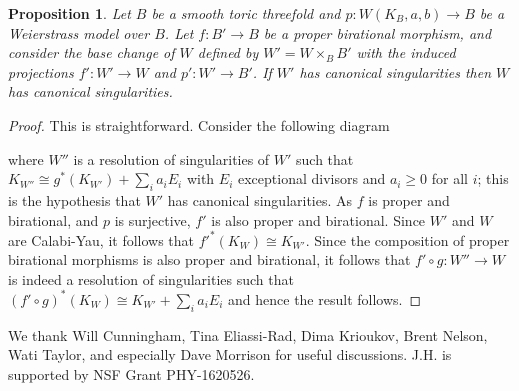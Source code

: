 \documentclass[aps,prl,twocolumn, superscriptaddress,groupedaddress,nofootinbib]{revtex4-1}
\newtheorem{prop}{Proposition}
\newcommand{\XXX}[3]{}
\begin{document}
\begin{prop}
\label{prop:pullback}
Let $B$ be a smooth toric threefold and $p \colon W(K_{B},a,b) \rightarrow B$ be a Weierstrass model over $B$. Let $f \colon B' \rightarrow B$ be a proper birational morphism, and consider the base change of $W$ defined by $W' = W\times_{B}B'$ with the induced projections $f' : W' \rightarrow W$ and $p' \colon W' \rightarrow B'$. If $W'$ has canonical singularities then $W$ has canonical singularities. 
\end{prop}
\begin{proof}
This is straightforward. Consider the following diagram
\begin{center}
\end{center}
where $W''$ is a resolution of singularities of $W'$ such that $K_{W''} \cong  g^{*}(K_{W'})+ \sum_{i}a_{i}E_{i}$ with $E_{i}$ exceptional divisors and $a_{i} \geq 0$ for all $i$; this is the hypothesis that $W'$ has canonical singularities. As $f$ is proper and birational, and $p$ is surjective, $f'$ is also proper and birational. Since $W'$ and $W$ are Calabi-Yau, it follows that $f'^{*}(K_{W}) \cong K_{W'}$. Since the composition of proper birational morphisms is also proper and birational, it follows that $f'\circ g\colon W'' \rightarrow W$ is indeed a resolution of singularities such that $(f'\circ g)^{*}(K_{W}) \cong K_{W'} + \sum_{i}a_{i}E_{i}$ and hence the result follows.
\XXX{bs}{jh,cl}{The point is that this composition map then provides a
resolution $W''\to W$ that gaurantees canonicality of $W$, right? If so, please write
this sentence. Thanks!}
\end{proof}
\vspace{.2cm}
 We thank Will Cunningham, Tina Eliassi-Rad, Dima Krioukov, Brent Nelson, Wati Taylor,
and especially Dave Morrison for useful discussions. 
J.H. is supported by
NSF Grant PHY-1620526.


\end{document}
